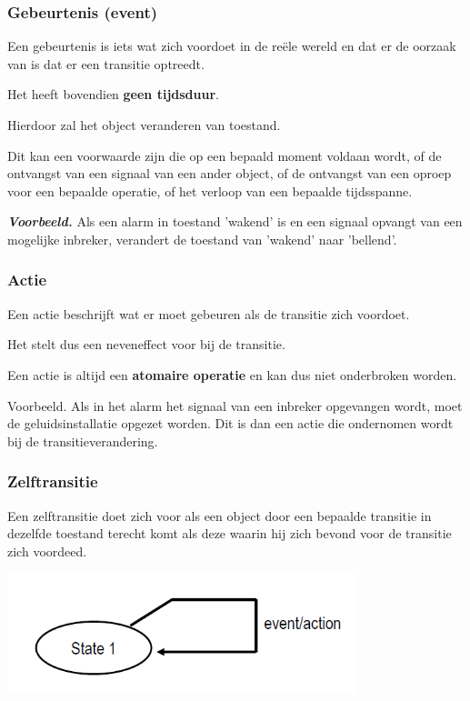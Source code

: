 \subsubsection{Gebeurtenis (event)}

Een gebeurtenis is iets wat zich voordoet in de reële wereld en dat er de oorzaak van is dat er een transitie optreedt. 

Het heeft bovendien \textbf{geen tijdsduur}.

Hierdoor zal het object veranderen van toestand. 

Dit kan een voorwaarde zijn die op een bepaald moment voldaan wordt, of de ontvangst van een signaal van een ander object, of de ontvangst van een oproep voor een bepaalde operatie, of het verloop van een bepaalde tijdsspanne.

\textit{\textbf{Voorbeeld.}} Als een alarm in toestand 'wakend' is en een signaal opvangt van een mogelijke inbreker, verandert de toestand van 'wakend' naar 'bellend'.

\subsubsection{Actie}

Een actie beschrijft wat er moet gebeuren als de transitie zich voordoet. 

Het stelt dus een neveneffect voor bij de transitie. 

Een actie is altijd een \textbf{atomaire operatie} en kan dus niet onderbroken worden.

Voorbeeld. Als in het alarm het signaal van een inbreker opgevangen wordt, moet de geluidsinstallatie opgezet worden. Dit is dan een actie die ondernomen wordt bij de transitieverandering.

\subsubsection{Zelftransitie}

Een zelftransitie doet zich voor als een object door een bepaalde transitie in dezelfde toestand terecht komt als deze waarin hij zich bevond voor de transitie zich voordeed.


\begin{center}
\includegraphics[width=4in]{img/state4}%
\end{center}

